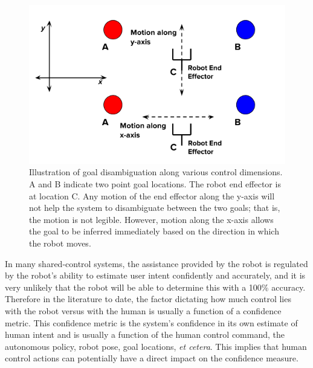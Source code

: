 \documentclass[conference]{IEEEtran}
\begin{document}
\begin{figure}[t]
	\centering
	\includegraphics[width = 1.0\hsize]{./figures/DE.png}
	\vspace{-0.7cm}
	\caption{Illustration of goal disambiguation along various control dimensions. A and B indicate two point goal locations. The robot end effector is at location C. Any motion of the end effector along the y-axis will not help the system to disambiguate between the two goals; that is, the motion is not legible. However, motion along the x-axis allows the goal to be inferred immediately based on the direction in which the robot moves. }
	\label{DE}
\end{figure}

 In many shared-control systems, the assistance provided by the robot is regulated by the robot's ability to estimate user intent confidently and accurately, and it is very unlikely that the robot will be able to determine this with a 100\% accuracy.  Therefore in the literature to date, the factor dictating how much control lies with the robot versus with the human is usually a function of a confidence metric. This confidence metric is the system's confidence in its own estimate of human intent and is usually a function of the human control command, the autonomous policy, robot pose, goal locations, \textit{et cetera}. This implies that human control actions can potentially have a direct impact on the confidence measure. 
\end{document}
